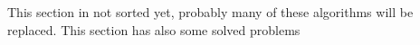 This section in not sorted yet, probably many of these algorithms will be replaced. This section has also some solved problems